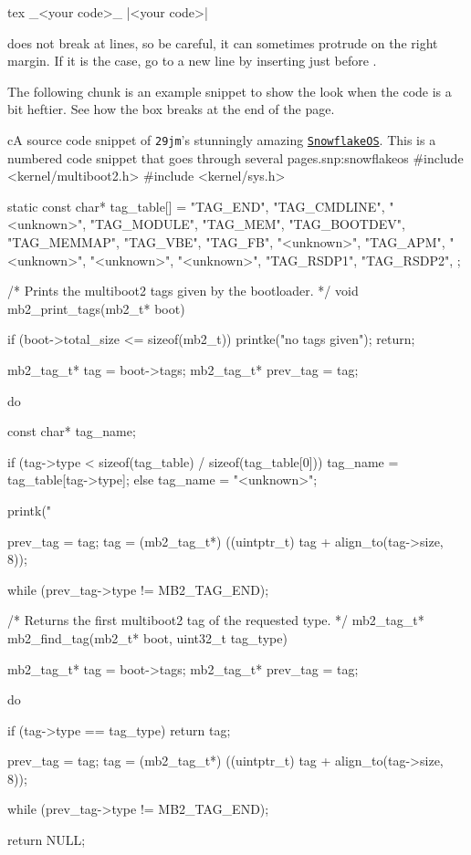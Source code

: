\documentclass[
	raggedright,
	12pt,
	colorful,
]{tufte-style-article}
\begin{document}
\begin{codebox}{tex}
_<your code>_ %
|<your code>|
\end{codebox}

 does not break at lines, so be careful, it can sometimes protrude on the right margin. If it is the case, go to a new line by inserting  just before .


The following chunk is an example snippet to show the look when the code is a bit heftier. See how the box breaks at the end of the page.

\begin{snippetnum}{c}{A source code snippet of \texttt{29jm}'s stunningly amazing \href{https://github.com/29jm/SnowflakeOS}{\texttt{SnowflakeOS}}. This is a numbered code snippet that goes through several pages.}{snp:snowflakeos}
#include <kernel/multiboot2.h>
#include <kernel/sys.h>

static const char* tag_table[] = {
	"TAG_END",
	"TAG_CMDLINE",
	"<unknown>",
	"TAG_MODULE",
	"TAG_MEM",
	"TAG_BOOTDEV",
	"TAG_MEMMAP",
	"TAG_VBE",
	"TAG_FB",
	"<unknown>",
	"TAG_APM",
	"<unknown>",
	"<unknown>",
	"<unknown>",
	"TAG_RSDP1",
	"TAG_RSDP2",
};

/* Prints the multiboot2 tags given by the bootloader.
*/
void mb2_print_tags(mb2_t* boot) {
	if (boot->total_size <= sizeof(mb2_t)) {
		printke("no tags given");
		return;
	}

	mb2_tag_t* tag = boot->tags;
	mb2_tag_t* prev_tag = tag;

	do {
		const char* tag_name;

		if (tag->type < sizeof(tag_table) / sizeof(tag_table[0])) {
			tag_name = tag_table[tag->type];
		} else {
			tag_name = "<unknown>";
		}

		printk("%

		prev_tag = tag;
		tag = (mb2_tag_t*) ((uintptr_t) tag + align_to(tag->size, 8));
	} while (prev_tag->type != MB2_TAG_END);
}

/* Returns the first multiboot2 tag of the requested type.
*/
mb2_tag_t* mb2_find_tag(mb2_t* boot, uint32_t tag_type) {
	mb2_tag_t* tag = boot->tags;
	mb2_tag_t* prev_tag = tag;

	do {
		if (tag->type == tag_type) {
			return tag;
		}

		prev_tag = tag;
		tag = (mb2_tag_t*) ((uintptr_t) tag + align_to(tag->size, 8));
	} while (prev_tag->type != MB2_TAG_END);

	return NULL;
}
\end{snippetnum}
\end{document}
